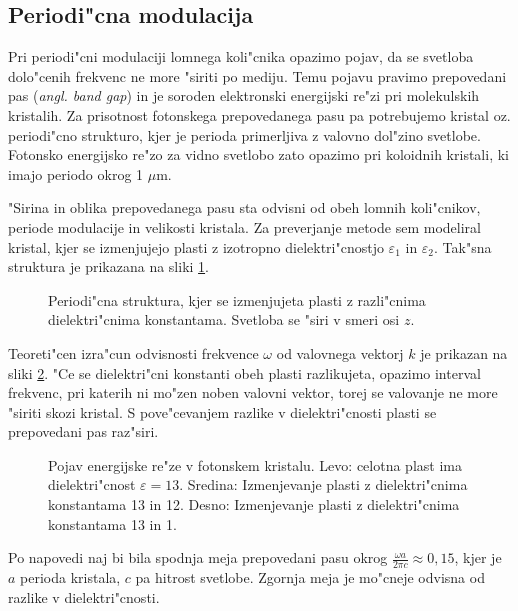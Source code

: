 \documentclass[a4paper,10pt]{article}
\newcommand{\angl}[1]{(\textit{angl. #1})}
\begin{document}
\subsection{Periodi"cna modulacija}

Pri periodi"cni modulaciji lomnega koli"cnika opazimo pojav, da se svetloba dolo"cenih frekvenc ne more "siriti po mediju\cite{joannopoulos}. 
Temu pojavu pravimo prepovedani pas \angl{band gap} in je soroden elektronski energijski re"zi pri molekulskih kristalih. 
Za prisotnost fotonskega prepovedanega pasu pa potrebujemo kristal oz. periodi"cno strukturo, kjer je perioda primerljiva z valovno dol"zino svetlobe. 
Fotonsko energijsko re"zo za vidno svetlobo zato opazimo pri koloidnih kristali, ki imajo periodo okrog 1 $\mu$m. 

"Sirina in oblika prepovedanega pasu sta odvisni od obeh lomnih koli"cnikov, periode modulacije in velikosti kristala. 
Za preverjanje metode sem modeliral kristal, kjer se izmenjujejo plasti z izotropno dielektri"cnostjo $\varepsilon_1$ in $\varepsilon_2$. 
Tak"sna struktura je prikazana na sliki \ref{fig:periodic-structure}. 

\begin{figure}[h]
 \centering
 
 \caption{Periodi"cna struktura, kjer se izmenjujeta plasti z razli"cnima dielektri"cnima konstantama. 
 Svetloba se "siri v smeri osi $z$\cite{joannopoulos}. }
 \label{fig:periodic-structure}
\end{figure}

Teoreti"cen izra"cun odvisnosti frekvence $\omega$ od valovnega vektorj $k$ je prikazan na sliki \ref{fig:joannopoulos-crystal}. 
"Ce se dielektri"cni konstanti obeh plasti razlikujeta, opazimo interval frekvenc, pri katerih ni mo"zen noben valovni vektor, torej se valovanje ne more "siriti skozi kristal. 
S pove"cevanjem razlike v dielektri"cnosti plasti se prepovedani pas raz"siri. 

\begin{figure}[h]
\centering
  
 \caption{Pojav energijske re"ze v fotonskem kristalu. Levo: celotna plast ima dielektri"cnost $\varepsilon = 13$. Sredina: Izmenjevanje plasti z dielektri"cnima konstantama 13 in 12. Desno: Izmenjevanje plasti z dielektri"cnima konstantama 13 in 1. \cite{joannopoulos}}
 \label{fig:joannopoulos-crystal}
\end{figure}

Po napovedi naj bi bila spodnja meja prepovedani pasu okrog $\frac{\omega a}{2\pi c} \approx 0,\!15$, kjer je $a$ perioda kristala, $c$ pa hitrost svetlobe. 
Zgornja meja je mo"cneje odvisna od razlike v dielektri"cnosti\cite{joannopoulos}. 
\end{document}
